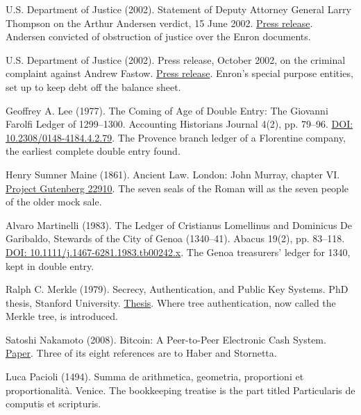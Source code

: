 \noindent U.S. Department of Justice (2002). Statement of Deputy Attorney General Larry Thompson on the Arthur Andersen verdict, 15 June 2002. \href{https://www.justice.gov/archive/opa/pr/2002/June/02_dag_356.htm}{Press release}. Andersen convicted of obstruction of justice over the Enron documents.
\par\medskip

\noindent U.S. Department of Justice (2002). Press release, October 2002, on the criminal complaint against Andrew Fastow. \href{https://www.justice.gov/archive/opa/pr/2002/October/02_crm_568.htm}{Press release}. Enron's special purpose entities, set up to keep debt off the balance sheet.
\par\medskip

\noindent Geoffrey A. Lee (1977). The Coming of Age of Double Entry: The Giovanni Farolfi Ledger of 1299--1300. Accounting Historians Journal 4(2), pp. 79--96. \href{https://doi.org/10.2308/0148-4184.4.2.79}{DOI: 10.2308/0148-4184.4.2.79}. The Provence branch ledger of a Florentine company, the earliest complete double entry found.
\par\medskip

\noindent Henry Sumner Maine (1861). Ancient Law. London: John Murray, chapter VI. \href{https://www.gutenberg.org/ebooks/22910}{Project Gutenberg 22910}. The seven seals of the Roman will as the seven people of the older mock sale.
\par\medskip

\noindent Alvaro Martinelli (1983). The Ledger of Cristianus Lomellinus and Dominicus De Garibaldo, Stewards of the City of Genoa (1340--41). Abacus 19(2), pp. 83--118. \href{https://doi.org/10.1111/j.1467-6281.1983.tb00242.x}{DOI: 10.1111/j.1467-6281.1983.tb00242.x}. The Genoa treasurers' ledger for 1340, kept in double entry.
\par\medskip

\noindent Ralph C. Merkle (1979). Secrecy, Authentication, and Public Key Systems. PhD thesis, Stanford University. \href{https://www.ralphmerkle.com/papers/Thesis1979.pdf}{Thesis}. Where tree authentication, now called the Merkle tree, is introduced.
\par\medskip

\noindent Satoshi Nakamoto (2008). Bitcoin: A Peer-to-Peer Electronic Cash System. \href{https://bitcoin.org/bitcoin.pdf}{Paper}. Three of its eight references are to Haber and Stornetta.
\par\medskip

\noindent Luca Pacioli (1494). Summa de arithmetica, geometria, proportioni et proportionalit\`a. Venice. The bookkeeping treatise is the part titled Particularis de computis et scripturis.
\par\medskip

